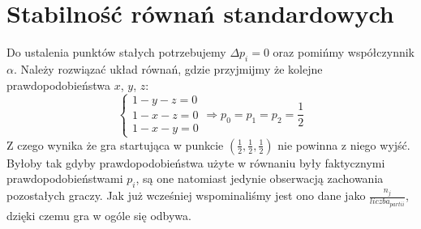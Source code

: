 \section{Stabilność równań standardowych}
\label{sec:stab_stand}
Do ustalenia punktów stałych potrzebujemy $\Delta p_i = 0$ oraz pomińmy współczynnik $\alpha$. Należy rozwiązać układ równań, gdzie przyjmijmy że kolejne prawdopodobieństwa $x$, $y$, $z$:
\begin{equation}
\left\{
\begin{array}{c}
1 - y - z = 0 \\
1 - x - z = 0 \\
1 - x - y = 0
\end{array}
\right. \Rightarrow p_0 = p_1 = p_2 = \frac{1}{2}
\end{equation}
Z czego wynika że gra startująca w punkcie $(\frac{1}{2},\frac{1}{2},\frac{1}{2})$ nie powinna z niego wyjść. Byłoby tak gdyby prawdopodobieństwa użyte w równaniu były faktycznymi prawdopodobieństwami $p_i$, są one natomiast jedynie obserwacją zachowania pozostałych graczy. Jak już wcześniej wspominaliśmy jest ono dane jako $\frac{n_j}{liczba_{partii}}$, dzięki czemu gra w ogóle się odbywa.
